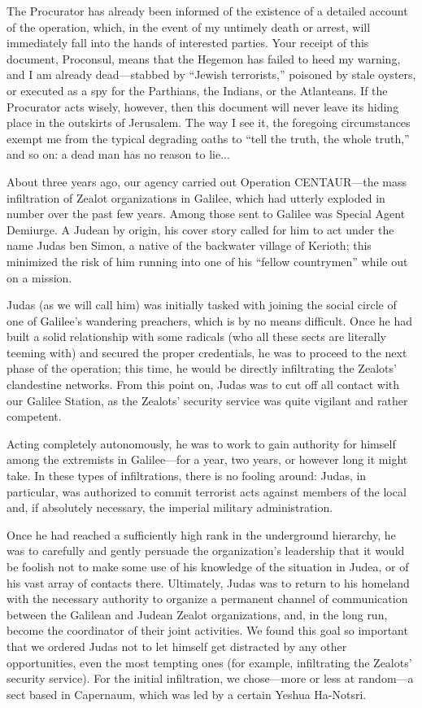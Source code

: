 The Procurator has already been informed of the existence of a detailed account of the operation, which, in the event of my untimely death or arrest, will immediately fall into the hands of interested parties. Your receipt of this document, Proconsul, means that the Hegemon has failed to heed my warning, and I am already dead---stabbed by ``Jewish terrorists,'' poisoned by stale oysters, or executed as a spy for the Parthians, the Indians, or the Atlanteans. If the Procurator acts wisely, however, then this document will never leave its hiding place in the outskirts of Jerusalem. The way I see it, the foregoing circumstances exempt me from the typical degrading oaths to ``tell the truth, the whole truth,'' and so on: a dead man has no reason to lie...

About three years ago, our agency carried out Operation CENTAUR---the mass infiltration of Zealot organizations in Galilee, which had utterly exploded in number over the past few years. Among those sent to Galilee was Special Agent Demiurge. A Judean by origin, his cover story called for him to act under the name Judas ben Simon, a native of the backwater village of Kerioth; this minimized the risk of him running into one of his ``fellow countrymen'' while out on a mission.

Judas (as we will call him) was initially tasked with joining the social circle of one of Galilee's wandering preachers, which is by no means difficult. Once he had built a solid relationship with some radicals (who all these sects are literally teeming with) and secured the proper credentials, he was to proceed to the next phase of the operation; this time, he would be directly infiltrating the Zealots' clandestine networks. From this point on, Judas was to cut off all contact with our Galilee Station, as the Zealots' security service was quite vigilant and rather competent.

Acting completely autonomously, he was to work to gain authority for himself among the extremists in Galilee---for a year, two years, or however long it might take. In these types of infiltrations, there is no fooling around: Judas, in particular, was authorized to commit terrorist acts against members of the local and, if absolutely necessary, the imperial military administration.

Once he had reached a sufficiently high rank in the underground hierarchy, he was to carefully and gently persuade the organization's leadership that it would be foolish not to make some use of his knowledge of the situation in Judea, or of his vast array of contacts there. Ultimately, Judas was to return to his homeland with the necessary authority to organize a permanent channel of communication between the Galilean and Judean Zealot organizations, and, in the long run, become the coordinator of their joint activities. We found this goal so important that we ordered Judas not to let himself get distracted by any other opportunities, even the most tempting ones (for example, infiltrating the Zealots' security service). For the initial infiltration, we chose---more or less at random---a sect based in Capernaum, which was led by a certain Yeshua Ha-Notsri.

